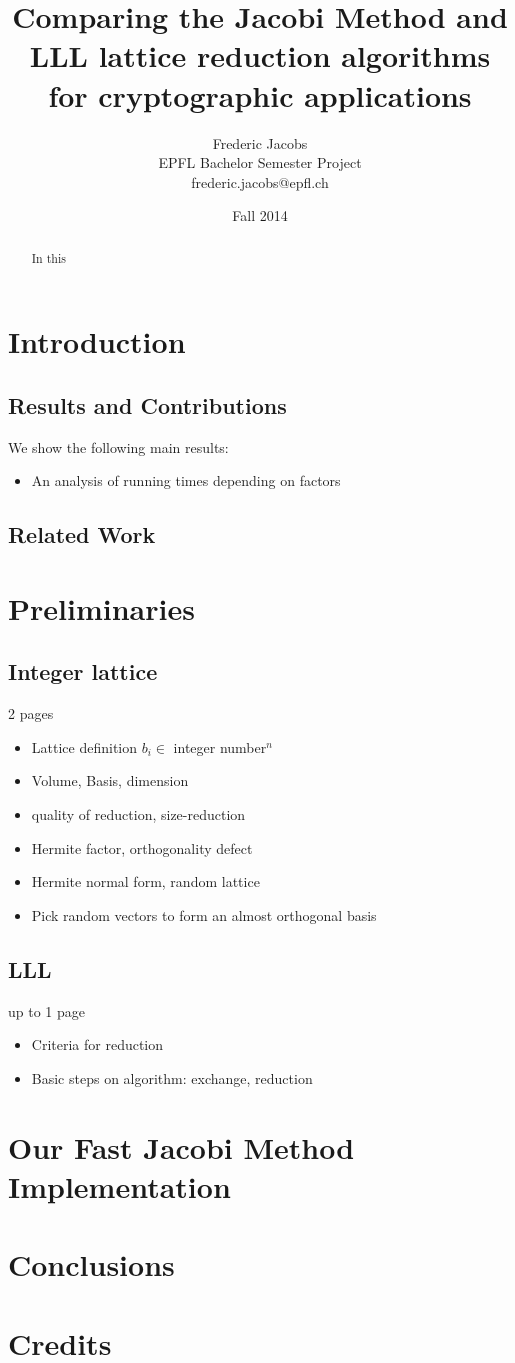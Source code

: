 \documentclass[12pt]{article}
\title{Comparing the Jacobi Method and LLL lattice reduction algorithms for cryptographic applications}
\date{Fall 2014}
\author{Frederic Jacobs\\ EPFL Bachelor Semester Project\\ frederic.jacobs@epfl.ch}
\begin{document}
\maketitle

\begin{abstract}
In this \cite{originalJacobiMethodLatticeBasisReduction}
\end{abstract}

\section{Introduction}


\subsection{Results and Contributions}

We show the following main results:
\begin{itemize}
\item An analysis of running times depending on factors
\end{itemize}


\subsection{Related Work}

\section{Preliminaries}
\subsection{Integer lattice}
2 pages
\begin{itemize}
\item Lattice definition $b_i \in $ integer number$^n$
\item Volume, Basis, dimension
\item quality of reduction, size-reduction
\item Hermite factor, orthogonality defect
\item Hermite normal form, random lattice
\item Pick random vectors to form an almost orthogonal basis
\end{itemize}
\subsection{LLL}
up to 1 page
\begin{itemize}
\item Criteria for reduction
\item Basic steps on algorithm: exchange, reduction
\end{itemize}

\section{Our Fast Jacobi Method Implementation}

\section{Conclusions}




\section{Credits}
\end{document}
